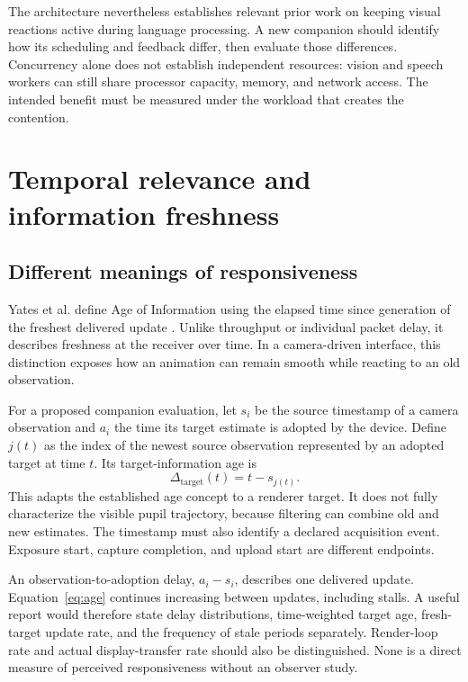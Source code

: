 \documentclass[journal]{IEEEtran}
\begin{document}
The architecture nevertheless establishes relevant prior work on keeping visual reactions active during language processing. A new companion should identify how its scheduling and feedback differ, then evaluate those differences. Concurrency alone does not establish independent resources: vision and speech workers can still share processor capacity, memory, and network access. The intended benefit must be measured under the workload that creates the contention.

\section{Temporal relevance and information freshness}
\subsection{Different meanings of responsiveness}
Yates et al. define Age of Information using the elapsed time since generation of the freshest delivered update \cite{yates2021}. Unlike throughput or individual packet delay, it describes freshness at the receiver over time. In a camera-driven interface, this distinction exposes how an animation can remain smooth while reacting to an old observation.

For a proposed companion evaluation, let $s_i$ be the source timestamp of a camera observation and $a_i$ the time its target estimate is adopted by the device. Define $j(t)$ as the index of the newest source observation represented by an adopted target at time $t$. Its target-information age is
\begin{equation}
\Delta_{\mathrm{target}}(t)=t-s_{j(t)}.
\label{eq:age}
\end{equation}
This adapts the established age concept to a renderer target. It does not fully characterize the visible pupil trajectory, because filtering can combine old and new estimates. The timestamp must also identify a declared acquisition event. Exposure start, capture completion, and upload start are different endpoints.

An observation-to-adoption delay, $a_i-s_i$, describes one delivered update. Equation~\ref{eq:age} continues increasing between updates, including stalls. A useful report would therefore state delay distributions, time-weighted target age, fresh-target update rate, and the frequency of stale periods separately. Render-loop rate and actual display-transfer rate should also be distinguished. None is a direct measure of perceived responsiveness without an observer study.
\end{document}
